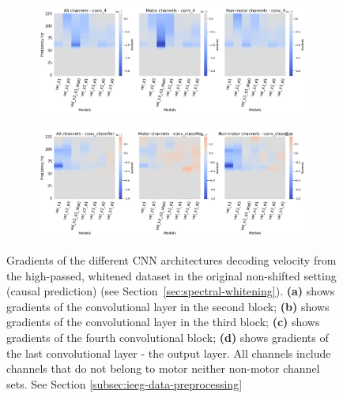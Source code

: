 \begin{figure}[!htbp]\ContinuedFloat

\begin{subfigure}[b]{\textwidth}
   \includegraphics[width=1\linewidth]{img/appendix/D/conv-4/hp-m/vel_model_gradients_all_kinds}
   \caption{}
   \label{fig:vel-pw-hp-grads-conv-4}
\end{subfigure}


\begin{subfigure}[b]{\textwidth}
   \includegraphics[width=1\linewidth]{img/appendix/D/conv-classifier/hp-m/vel_model_gradients_all_kinds}
   \caption{}
   \label{fig:vel-pw-hp-grads-conv-classifier}
\end{subfigure}

\caption[]{Gradients of the different CNN architectures decoding velocity from the high-passed, whitened dataset in the original non-shifted setting (causal prediction) (see Section~\ref{sec:spectral-whitening}). \textbf{(a)} shows gradients of the convolutional layer in the second block; \textbf{(b)} shows gradients of the convolutional layer in the third block; \textbf{(c)} shows gradients of the fourth convolutional block; \textbf{(d)} shows gradients of the last convolutional layer - the output layer. All channels include channels that do not belong to motor neither non-motor channel sets. See Section \ref{subsec:ieeg-data-preprocessing}}
\label{fig:vel-pw-hp-grads}
\end{figure}

